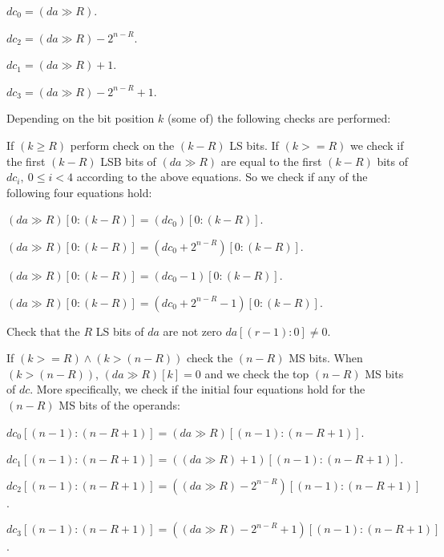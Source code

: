 \begin{DoxyItemize}
\item $dc_0 = (da \gg R)$.
\item $dc_2 = (da \gg R) - 2^{n-R}$.
\item $dc_1 = (da \gg R) + 1$.
\item $dc_3 = (da \gg R) - 2^{n-R} + 1$.
\end{DoxyItemize}

\-Depending on the bit position $k$ (some of) the following checks are performed\-:


\begin{DoxyEnumerate}
\item \-If $(k \ge R)$ perform check on the $(k-R)$ \-L\-S bits. \-If $(k >= R)$ we check if the first $(k-R)$ \-L\-S\-B bits of $(da \gg R)$ are equal to the first $(k-R)$ bits of $dc_i,~ 0 \le i < 4$ according to the above equations. \-So we check if any of the following four equations hold\-:
\begin{DoxyItemize}
\item $(da \gg R)[0:(k - R)] = (dc_0)[0:(k - R)]$.
\item $(da \gg R)[0:(k - R)] = (dc_0 + 2^{n-R})[0:(k - R)]$.
\item $(da \gg R)[0:(k - R)] = (dc_0 - 1)[0:(k - R)]$.
\item $(da \gg R)[0:(k - R)] = (dc_0 + 2^{n-R} - 1)[0:(k - R)]$.
\end{DoxyItemize}
\item \-Check that the $R$ \-L\-S bits of $da$ are not zero $da[(r-1):0] \neq 0$.
\item \-If $(k >= R) \wedge (k > (n - R))$ check the $(n-R)$ \-M\-S bits. \-When $(k > (n - R))$, $(da \gg R)[k] = 0$ and we check the top $(n-R)$ \-M\-S bits of $dc$. \-More specifically, we check if the initial four equations hold for the $(n-R)$ \-M\-S bits of the operands\-:
\begin{DoxyItemize}
\item $dc_0[(n-1):(n-R+1)] = (da \gg R)[(n-1):(n-R+1)]$.
\item $dc_1[(n-1):(n-R+1)] = ((da \gg R) + 1)[(n-1):(n-R+1)]$.
\item $dc_2[(n-1):(n-R+1)] = ((da \gg R) - 2^{n-R})[(n-1):(n-R+1)]$.
\item $dc_3[(n-1):(n-R+1)] = ((da \gg R) - 2^{n-R} + 1)[(n-1):(n-R+1)]$. 
\end{DoxyItemize}
\end{DoxyEnumerate}\hypertarget{tea-f-add-pddt_8hh_af962bfb5724a4f1dd45fdb2fdeac49f4}{
}
